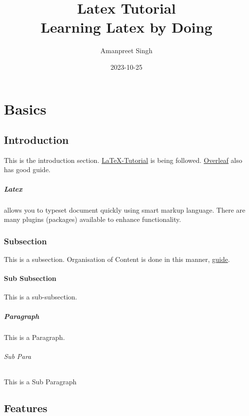 \documentclass{report}[a4paper,12pt] %
\title{\huge Latex Tutorial \\ \normalsize Learning Latex by Doing}
\author{Amanpreet Singh}
\date{2023-10-25}
\begin{document}
  \maketitle %
  \newpage %
  \tableofcontents

\chapter{Basics} %
\section{Introduction}
This is the introduction section.
\href{http://www.latex-tutorial.com}{LaTeX-Tutorial} is being followed.
\href{https://www.overleaf.com/learn}{Overleaf} also has good guide.

\paragraph*{Latex} allows you to typeset document quickly using smart markup language.
There are many plugins (packages) available to enhance functionality.

\subsection{Subsection}
This is a subsection.  
Organisation of Content is done in this manner, \href{https://www.overleaf.com/learn/latex/Sections_and_chapters}{guide}.

\subsubsection{Sub Subsection}
This is a sub-subsection.

\paragraph{Paragraph} 
This is a Paragraph.

\subparagraph{Sub Para}
This is a Sub Paragraph

\section{Features}
\end{document}
